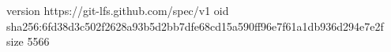 version https://git-lfs.github.com/spec/v1
oid sha256:6fd38d3c502f2628a93b5d2bb7dfe68cd15a590ff96e7f61a1db936d294e7e2f
size 5566
